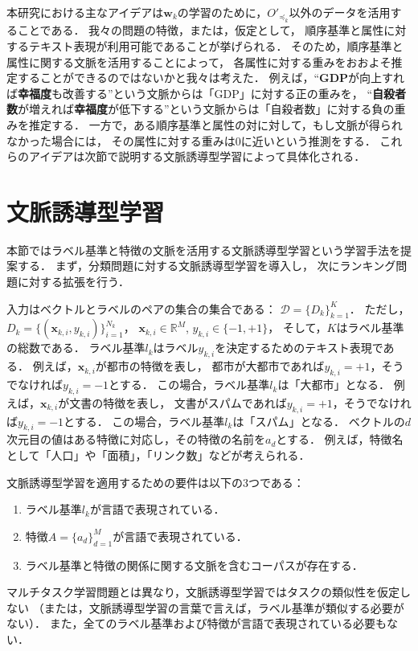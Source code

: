 本研究における主なアイデアは${\mathbf w}_{k}$の学習のために，$O'_{\preceq_{k}}$以外のデータを活用することである．
我々の問題の特徴，または，仮定として，
順序基準と属性に対するテキスト表現が利用可能であることが挙げられる．
そのため，順序基準と属性に関する文脈を活用することによって，
各属性に対する重みをおおよそ推定することができるのではないかと我々は考えた．
例えば，``{\bf GDP}が向上すれば{\bf 幸福度}も改善する''という文脈からは「GDP」に対する正の重みを，
``{\bf 自殺者数}が増えれば{\bf 幸福度}が低下する''という文脈からは「自殺者数」に対する負の重みを推定する．
一方で，ある順序基準と属性の対に対して，もし文脈が得られなかった場合には，
その属性に対する重みは0に近いという推測をする．
これらのアイデアは次節で説明する文脈誘導型学習によって具体化される．

\section{文脈誘導型学習}
本節ではラベル基準と特徴の文脈を活用する文脈誘導型学習という学習手法を提案する．
まず，分類問題に対する文脈誘導型学習を導入し，
次にランキング問題に対する拡張を行う．

入力はベクトルとラベルのペアの集合の集合である：
${\mathcal D} = \{D_k\}^K_{k = 1}$．
ただし， $D_k=\{({\mathbf x}_{k,i}, y_{k,i})\}^{N_k}_{i=1}$，
${\mathbf x}_{k,i} \in {\mathbb R}^M$, $y_{k,i} \in \{-1, +1\}$，
そして，$K$はラベル基準の総数である．
ラベル基準$l_k$はラベル$y_{k,i}$を決定するためのテキスト表現である．
例えば，${\mathbf x}_{k,i}$が都市の特徴を表し，
都市が大都市であれば$y_{k,i} = +1$，そうでなければ$y_{k,i} = -1$とする．
この場合，ラベル基準$l_k$は「大都市」となる．
例えば，${\mathbf x}_{k,i}$が文書の特徴を表し，
文書がスパムであれば$y_{k,i} = +1$，そうでなければ$y_{k,i} = -1$とする．
この場合，ラベル基準$l_k$は「スパム」となる．
ベクトルの$d$次元目の値はある特徴に対応し，その特徴の名前を$a_d$とする．
例えば，特徴名として「人口」や「面積」，「リンク数」などが考えられる．

文脈誘導型学習を適用するための要件は以下の3つである：
\begin{enumerate}
\setlength{\parskip}{0em}
\setlength{\itemsep}{0em}
\item ラベル基準$l_k$が言語で表現されている．
\item 特徴$A=\{a_d\}^{M}_{d=1}$が言語で表現されている．
\item ラベル基準と特徴の関係に関する文脈を含むコーパスが存在する．
\end{enumerate}
マルチタスク学習問題とは異なり，文脈誘導型学習ではタスクの類似性を仮定しない
（または，文脈誘導型学習の言葉で言えば，ラベル基準が類似する必要がない）．
また，全てのラベル基準および特徴が言語で表現されている必要もない．

